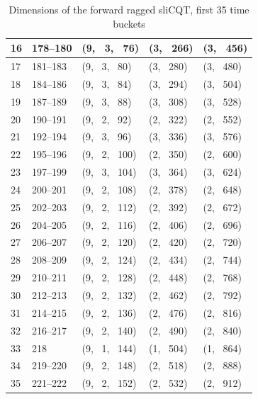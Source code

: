 \documentclass[report.tex]{subfiles}
\begin{document}
\begin{table}[ht]
\begin{tabular}{ |l|l|l|l|l| }
\hline
16 & 178--180 & (9, \ 3, \ 76) & (3, \ 266) & (3, \ 456) \\
\hline
17 & 181--183 & (9, \ 3, \ 80) & (3, \ 280) & (3, \ 480) \\
\hline
18 & 184--186 & (9, \ 3, \ 84) & (3, \ 294) & (3, \ 504) \\
\hline
19 & 187--189 & (9, \ 3, \ 88) & (3, \ 308) & (3, \ 528) \\
\hline
20 & 190--191 & (9, \ 2, \ 92) & (2, \ 322) & (2, \ 552) \\
\hline
21 & 192--194 & (9, \ 3, \ 96) & (3, \ 336) & (3, \ 576) \\
\hline
22 & 195--196 & (9, \ 2, \ 100) & (2, \ 350) & (2, \ 600) \\
\hline
23 & 197--199 & (9, \ 3, \ 104) & (3, \ 364) & (3, \ 624) \\
\hline
24 & 200--201 & (9, \ 2, \ 108) & (2, \ 378) & (2, \ 648) \\
\hline
25 & 202--203 & (9, \ 2, \ 112) & (2, \ 392) & (2, \ 672) \\
\hline
26 & 204--205 & (9, \ 2, \ 116) & (2, \ 406) & (2, \ 696) \\
\hline
27 & 206--207 & (9, \ 2, \ 120) & (2, \ 420) & (2, \ 720) \\
\hline
28 & 208--209 & (9, \ 2, \ 124) & (2, \ 434) & (2, \ 744) \\
\hline
29 & 210--211 & (9, \ 2, \ 128) & (2, \ 448) & (2, \ 768) \\
\hline
30 & 212--213 & (9, \ 2, \ 132) & (2, \ 462) & (2, \ 792) \\
\hline
31 & 214--215 & (9, \ 2, \ 136) & (2, \ 476) & (2, \ 816) \\
\hline
32 & 216--217 & (9, \ 2, \ 140) & (2, \ 490) & (2, \ 840) \\
\hline
33 & 218 & (9, \ 1, \ 144) & (1, \ 504) & (1, \ 864) \\
\hline
34 & 219--220 & (9, \ 2, \ 148) & (2, \ 518) & (2, \ 888) \\
\hline
35 & 221--222 & (9, \ 2, \ 152) & (2, \ 532) & (2, \ 912) \\
\hline
\end{tabular}
	\caption{Dimensions of the forward ragged sliCQT, first 35 time buckets}
	\label{table:slicqdim1}
\end{table}
\end{document}
